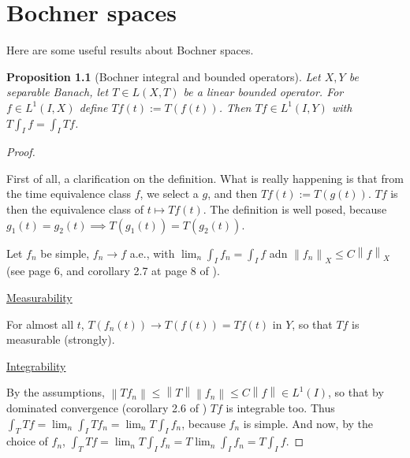\documentclass[english,a4paper,12pt,oneside]{scrbook}
\theoremstyle{break}
\newtheorem{prop}[equation]{Proposition}
\newenvironment{mproof}[1][\proofname]{%
  \begin{proof}[#1]$ $\par\nobreak\ignorespaces
}{%
  \end{proof}
}
\renewcommand*{\proofname}{Proof}
\theoremstyle{remark}
\newcommand{\norm}[1]{\left\lVert#1\right\rVert}
\begin{document}
\chapter{Bochner spaces}

Here are some useful results about Bochner spaces.

\begin{prop}[Bochner integral and bounded operators]
\label{prop:bochner_bound}
Let $X,Y$ be separable Banach, let $T \in L(X,T)$ be a linear bounded operator. For $f \in L^1(I,X)$ define $Tf (t):= T(f(t))$. Then $Tf \in L^1(I,Y)$ with $T\int_I f = \int_I Tf$.
\end{prop}
\begin{mproof}

First of all, a clarification on the definition. What is really happening is that from the time equivalence class $f$, we select a $g$, and then $Tf(t):=T(g(t))$. $Tf$ is then the equivalence class of $t\mapsto Tf(t)$. The definition is well posed, because $g_1(t)=g_2(t)\implies T(g_1(t))=T(g_2(t))$.

Let $f_n$ be simple, $f_n\rightarrow f $ a.e., with $\lim_n \int_I f_n = \int_I f$ adn $\norm{f_n}_X \leq C \norm{f}_X$ (see page 6, and corollary 2.7 at page 8 of \cite{kreuter}).

\underline{Measurability}

For almost all $t$, $T(f_n(t)) \rightarrow T(f(t))=Tf(t)$ in $Y$, so that $Tf$ is measurable (strongly).

\underline{Integrability}

By the assumptions, $\norm{Tf_n}\leq \norm{T}\norm{f_n}\leq C\norm{f}\in L^1(I)$, so that by dominated convergence (corollary 2.6 of \cite{kreuter}) $Tf$ is integrable too. Thus $\int_T Tf = \lim_n \int_I  Tf_n = \lim_n T\int_I  f_n$, because $f_n$ is simple. And now, by the choice of $f_n$, $\int_T Tf = \lim_n T\int_I  f_n = T \lim_n \int_I  f_n = T \int_I f$.

\end{mproof}
\end{document}
